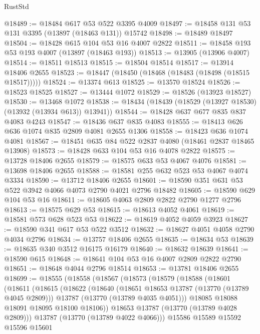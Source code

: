 \begin{lexlean}{RustStd}
\begin{coremodule}
@18489 := @18484 @617 @53 @522 @3395 @4009
@18497 := @18458 @131 @53 @131 @3395 (@13897 (@18463 @131)) @15742
@18498 := @18489 @18497
@18504 := @18428 @615 @104 @53 @16 @4007 @2822
@18511 := @18458 @193 @53 @193 @4007 (@13897 (@18463 @193))
@18513 := @13905 (@13906 @4007)
@18514 := @18511 @18513
@18515 := @18504 @18514
@18517 := @13914 @18406 @2655
@18523 := @18447 (@18450 (@18468 (@18483 (@18498 (@18515 @18517)))))
@18524 := @13374 @613
@18525 := @13570 @18524
@18526 := @18523 @18525
@18527 := @13444 @1072
@18529 := @18526 (@13923 @18527)
@18530 := @13468 @1072
@18538 := @18434 (@18439 (@18529 (@13927 @18530) (@13932 (@13934 @613)) @13941))
@18544 := @18428 @637 @677 @835 @837 @4083 @4243
@18547 := @18436 @637 @835 @4083
@18555 := @18413 @626 @636 @1074 @835 @2809 @4081 @2655 @1306
@18558 := @18423 @636 @1074 @4081
@18567 := @18451 @635 @84 @522 @2837 @4080 (@18461 @2837 @18465 @13908)
@18573 := @18428 @633 @104 @53 @16 @4078 @2822
@18575 := @13728 @18406 @2655
@18579 := @18575 @633 @53 @4067 @4076
@18581 := @13698 @18406 @2655
@18588 := @18581 @255 @632 @523 @53 @4067 @4074 @3334
@18590 := @13712 @18406 @2655
@18601 := @18590 @351 @631 @53 @522 @3942 @4066 @4073 @2790 @4021 @2796 @18482
@18605 := @18590 @629 @104 @53 @16
@18611 := @18605 @4063 @2809 @2822 @2790 @1277 @2796
@18613 := @18575 @629 @53
@18615 := @18613 @4052 @4061
@18619 := @18581 @573 @628 @523 @53
@18622 := @18619 @4052 @4059 @3923
@18627 := @18590 @341 @617 @53 @522 @3512
@18632 := @18627 @4051 @4058 @2790 @4034 @2796
@18634 := @13757 @18406 @2655
@18635 := @18634 @53
@18639 := @18635 @340 @3512 @16175 @16179
@18640 := @18632 @18639
@18641 := @18590 @615
@18648 := @18641 @104 @53 @16 @4007 @2809 @2822 @2790
@18651 := @18648 @4044 @2796 @18514
@18653 := @13781 @18406 @2655
@18699 := @18555
    (@18558
      (@18567
        (@18573
          (@18579
            (@18588
              (@18601
                (@18611
                  (@18615
                    (@18622
                      (@18640
                        (@18651 @18653 @13787 (@13770 (@13789 @4045 @2809)))
                        @13787
                        (@13770 (@13789 @4035 @4051)))
                      @18085
                      @18088
                      @18091
                      @18095
                      @18100
                      @18106))
                  @18653
                  @13787
                  (@13770 (@13789 @4028 @2809)))
                @13787
                (@13770 (@13789 @4022 @4066)))
              @15586
              @15589
              @15592
              @15596
              @15601

\end{coremodule}
\end{lexlean}
